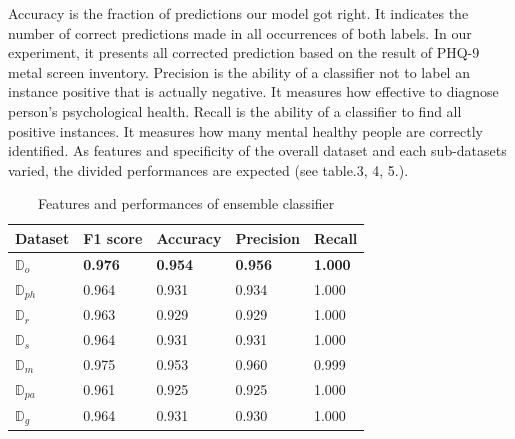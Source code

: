 \documentclass[10pt,journal,compsoc]{IEEEtran}
\begin{document}
Accuracy is the fraction of predictions our model got right. It indicates the number of correct predictions made in all occurrences of both labels. In our experiment, it presents all corrected prediction based on the result of PHQ-9 metal screen inventory. Precision is the ability of a classifier not to label an instance positive that is actually negative. It measures how effective to diagnose person’s psychological health. Recall is the ability of a classifier to find all positive instances. It measures how many mental healthy people are correctly identified. As features and specificity of the overall dataset and each sub-datasets varied, the divided performances are expected (see table.3, 4, 5.). 
\begin{table}[ht]
\centering
\begin{tabular}{|C{1cm}|C{1.2cm}|C{1.2cm}|C{1.2cm}|C{1.2cm}|}
\hline
{} 
{\color[HTML]{000000} \textbf{Dataset}} & {\color[HTML]{000000} \textbf{F1 score}} & {\color[HTML]{000000} \textbf{Accuracy}}  & {\color[HTML]{000000} \textbf{Precision}} & {\color[HTML]{000000} \textbf{Recall}} \\ \hline
{} 
\textbf{$\mathbb{D}_{o}$}& \textbf{0.976}  & \textbf{0.954} &\textbf{0.956} &\textbf{1.000}\\ \hline
{} 
\textbf{$\mathbb{D}_{ph}$}& 0.964  & 0.931 &0.934 &1.000 \\ \hline
{} 
\textbf{$\mathbb{D}_{r}$} & 0.963   & 0.929  &0.929 &1.000 \\ \hline
{} 
\textbf{$\mathbb{D}_{s}$} & 0.964  & 0.931 &0.931 &1.000 \\ \hline
{} 
\textbf{$\mathbb{D}_{m}$ } & 0.975  & 0.953  &0.960 &0.999 \\ \hline
{} 
\textbf{$\mathbb{D}_{pa} $ }& 0.961  & 0.925 &0.925 &1.000 \\ \hline
{} 
\textbf{$\mathbb{D}_{g}$ } & 0.964  & 0.931 &0.930 &1.000 \\ \hline
\end{tabular}
\caption{Features and performances of ensemble classifier}
\label{subsets}
\end{table}
%
\end{document}

